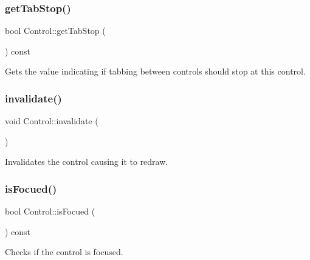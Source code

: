 \mbox{\label{class_control_ac3e5fe103ee3a77c3980bb02771ec38c}} 
\subsubsection{\texorpdfstring{getTabStop()}{getTabStop()}}
{\footnotesize\ttfamily bool Control\+::get\+Tab\+Stop (\begin{DoxyParamCaption}{ }\end{DoxyParamCaption}) const}



Gets the value indicating if tabbing between controls should stop at this control. 

\mbox{\label{class_control_a501fa3ad934e32bb8f904f8a49bd9c20}} 
\subsubsection{\texorpdfstring{invalidate()}{invalidate()}}
{\footnotesize\ttfamily void Control\+::invalidate (\begin{DoxyParamCaption}{ }\end{DoxyParamCaption})}



Invalidates the control causing it to redraw. 

\mbox{\label{class_control_a310370bda804e4e9b80acdbc7f033402}} 
\subsubsection{\texorpdfstring{isFocued()}{isFocued()}}
{\footnotesize\ttfamily bool Control\+::is\+Focued (\begin{DoxyParamCaption}{ }\end{DoxyParamCaption}) const}



Checks if the control is focused. 

\mbox{\label{class_control_a5f89270d0d05a6bac9128db0b1d290d2}} 
